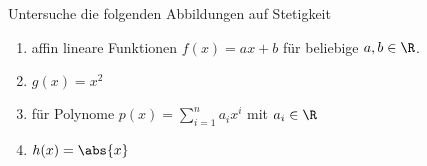 \begin{exercise}[Stetigkeit]
  Untersuche die folgenden Abbildungen auf Stetigkeit
  \begin{enumerate}
  \item affin lineare Funktionen $f(x) = ax + b$ für beliebige $a,b \in \R$.
  \item $g(x) = x^2$
  \item für Polynome $p(x) = \sum_{i = 1}^n a_i x^i$ mit $a_i \in \R$
  \item $h(x) = \abs{x}$
  \end{enumerate}
\end{exercise}
